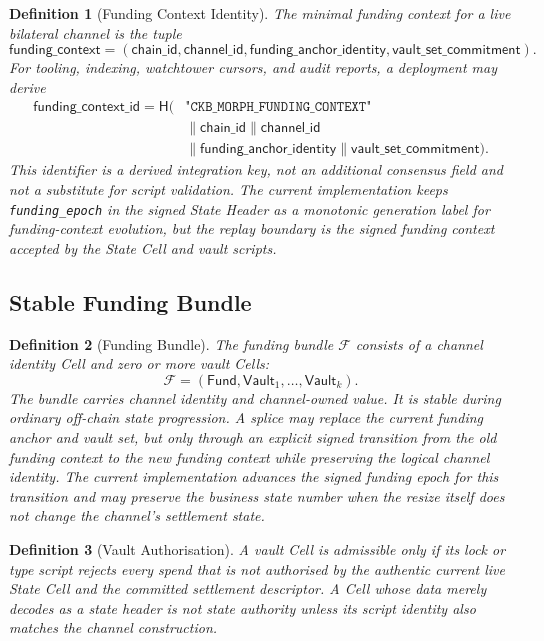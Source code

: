 \documentclass[a4paper,11pt]{article}
\newtheorem{definition}{Definition}
\newcommand{\Fund}{\mathsf{Fund}}
\newcommand{\Vault}{\mathsf{Vault}}
\newcommand{\hash}{\mathsf{H}}
\begin{document}
\begin{definition}[Funding Context Identity]
The minimal funding context for a live bilateral channel is the tuple
\[
\mathsf{funding\_context} =
(\mathsf{chain\_id},\mathsf{channel\_id},
\mathsf{funding\_anchor\_identity},
\mathsf{vault\_set\_commitment}).
\]
For tooling, indexing, watchtower cursors, and audit reports, a deployment may
derive
\[
\begin{aligned}
\mathsf{funding\_context\_id} =
\hash(&\texttt{"CKB\_MORPH\_FUNDING\_CONTEXT"}\\
&\parallel \mathsf{chain\_id}
\parallel \mathsf{channel\_id}\\
&\parallel \mathsf{funding\_anchor\_identity}
\parallel \mathsf{vault\_set\_commitment}).
\end{aligned}
\]
This identifier is a derived integration key, not an additional consensus
field and not a substitute for script validation. The current implementation
keeps \texttt{funding\_epoch} in the signed State Header as a monotonic
generation label for funding-context evolution, but the replay boundary is the
signed funding context accepted by the State Cell and vault scripts.
\end{definition}

\subsection{Stable Funding Bundle}

\begin{definition}[Funding Bundle]
The funding bundle $\mathcal{F}$ consists of a channel identity Cell and zero or more vault Cells:
\[
\mathcal{F} = (\Fund, \Vault_1,\ldots,\Vault_k).
\]
The bundle carries channel identity and channel-owned value. It is stable during ordinary off-chain state progression. A splice may replace the current funding anchor and vault set, but only through an explicit signed transition from the old funding context to the new funding context while preserving the logical channel identity. The current implementation advances the signed funding epoch for this transition and may preserve the business state number when the resize itself does not change the channel's settlement state.
\end{definition}

\begin{definition}[Vault Authorisation]
A vault Cell is admissible only if its lock or type script rejects every spend that is not authorised by the authentic current live State Cell and the committed settlement descriptor. A Cell whose data merely decodes as a state header is not state authority unless its script identity also matches the channel construction.
\end{definition}
\end{document}

